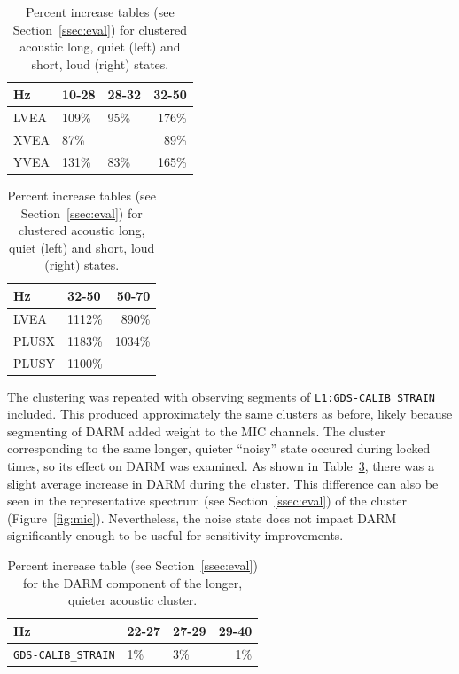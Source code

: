 \documentclass[colorlinks=true,pdfstartview=FitV,linkcolor=blue,
            citecolor=red,urlcolor=magenta]{ligodoc}
\begin{document}
\begin{table}\hspace{2em}
  \begin{tabular}{l|llr}
    Hz & 10-28 & 28-32 & 32-50 \\ \hline
    LVEA & 109\% & 95\% & 176\% \\
    XVEA & 87\% &   &  89\% \\
    YVEA & 131\% & 83\% & 165\%
  \end{tabular}\hfill
  \begin{tabular}{l|lr}
    Hz & 32-50 & 50-70 \\ \hline
    LVEA & 1112\% & 890\% \\
    PLUSX & 1183\% & 1034\% \\
    PLUSY & 1100\%
  \end{tabular}\hspace{2em}
  \caption{Percent increase tables (see Section~\ref{ssec:eval}) for clustered acoustic long, quiet (left) and short, loud (right) states.}\label{tab:mic}
\end{table}

The clustering was repeated with observing segments of \texttt{L1:GDS-CALIB\_STRAIN} included.
This produced approximately the same clusters as before, likely because segmenting of DARM added weight to the MIC channels.
The cluster corresponding to the same longer, quieter ``noisy'' state occured during locked times, so its effect on DARM was examined.
As shown in Table~\ref{tab:micdarm}, there was a slight average increase in DARM during the cluster.
This difference can also be seen in the representative spectrum (see Section~\ref{ssec:eval}) of the cluster (Figure~\ref{fig:mic}).
Nevertheless, the noise state does not impact DARM significantly enough to be useful for sensitivity improvements.

\begin{table}\centering
  \begin{tabular}{l|llr}
    Hz & 22-27 & 27-29 & 29-40 \\ \hline
    \texttt{GDS-CALIB\_STRAIN} & 1\% & 3\% & 1\%
  \end{tabular}
  \caption{Percent increase table (see Section~\ref{ssec:eval}) for the DARM component of the longer, quieter acoustic cluster.}\label{tab:micdarm}
\end{table}
\end{document}
